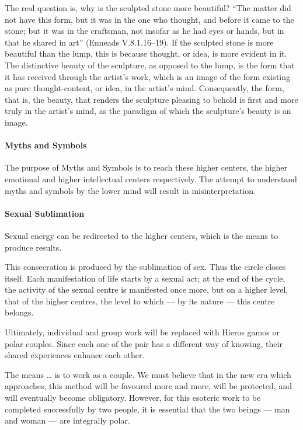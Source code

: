 \begin{quotex}
The real question is, why is the sculpted stone more beautiful? “The matter did not have this form, but it was in the one who thought, and before it came to the stone; but it was in the craftsman, not insofar as he had eyes or hands, but in that he shared in art” (Enneads V.8.1.16–19). If the sculpted stone is more beautiful than the lump, this is because thought, or idea, is more evident in it. The distinctive beauty of the sculpture, as opposed to the lump, is the form that it has received through the artist's work, which is an image of the form existing as pure thought-content, or idea, in the artist's mind. Consequently, the form, that is, the beauty, that renders the sculpture pleasing to behold is first and more truly in the artist's mind, as the paradigm of which the sculpture's beauty is an image. 

\end{quotex}
\paragraph{Myths and Symbols}
The purpose of Myths and Symbols is to reach these higher centers, the higher emotional and higher intellectual centers respectively. The attempt to understand myths and symbols by the lower mind will result in misinterpretation.

\paragraph{Sexual Sublimation}
Sexual energy can be redirected to the higher centers, which is the means to produce results.

\begin{quotex}
This consecration is produced by the sublimation of sex. Thus the circle closes itself. Each manifestation of life starts by a sexual act; at the end of the cycle, the activity of the sexual centre is manifested once more, but on a higher level, that of the higher centres, the level to which — by its nature — this centre belongs. 

\end{quotex}
Ultimately, individual and group work will be replaced with Hieros gamos or polar couples. Since each one of the pair has a different way of knowing, their shared experiences enhance each other.

\begin{quotex}
The means … is to work as a couple. We must believe that in the new era which approaches, this method will be favoured more and more, will be protected, and will eventually become obligatory. However, for this esoteric work to be completed successfully by two people, it is essential that the two beings — man and woman — are integrally polar. 
\end{quotex}

